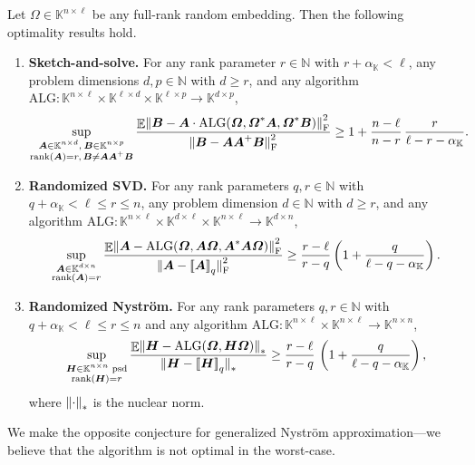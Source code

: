 \documentclass[11pt]{article}
\newcommand{\field}{\mathbb{K}}
\DeclareMathOperator{\rank}{rank}
\newcommand{\mat}[1]{\boldsymbol{#1}}
\newcommand{\lowrank}[1]{%
  \mleft[\!\mleft[ #1 \mright]\!\mright]}
\newcommand{\norm}[1]{\mleft\| #1 \mright\|}
\DeclareMathOperator{\expect}{\mathbb{E}}
\theoremstyle{definition}
\numberwithin{equation}{section}
\begin{document}
\begin{conjecture}
    Let $\mat{\varOmega} \in \field^{n \times \ell}$ be any full-rank random embedding.
    Then the following optimality results hold.
    \begin{enumerate}[label=(\alph*)]
        \item \textbf{Sketch-and-solve.} For any rank parameter $r \in \mathbb{N}$ with $r + \alpha_\field < \ell$, any problem dimensions $d, p \in \mathbb{N}$ with $d \geq r$, and any algorithm $\mathrm{ALG} : \field^{n \times \ell} \times \field^{\ell \times d} \times \field^{\ell \times p} \to \field^{d \times p}$,
        \begin{equation*}
            \sup_{\substack{\mat{A}\in \field^{n\times d},\: \mat{B} \in \field^{n\times p} \\
            \rank(\mat{A}) = r,\,\mat{B}\neq\mat{A}\mat{A}^+\mat{B}}} \frac{\expect \norm{\mat{B} - \mat{A}\cdot\mathrm{ALG}(\mat{\varOmega},\mat{\varOmega}^*\mat{A},\mat{\varOmega}^* \mat{B})}_{\rm F}^2}{\norm{\smash{\mat{B} - \mat{A} \mat{A}^+ \mat{B}}}_{\rm F}^2} 
            \ge 1 + \frac{n-\ell}{n-r}\, \frac{r}{\ell - r - \alpha_\field}.
        \end{equation*}
        \item \textbf{Randomized SVD.} 
        For any rank parameters $q,r \in \mathbb{N}$ with $q + \alpha_{\field} < \ell \leq r \leq n$,
        any problem dimension $d \in \mathbb{N}$ with $d \geq r$, and any algorithm $\mathrm{ALG} : \field^{n \times \ell} \times \field^{d \times \ell} \times \field^{n \times \ell} \to \field^{d \times n}$,
        \begin{equation*}
            \sup_{\substack{\mat{A} \in \field^{d \times n} \\ \rank(\mat{A}) = r}} \frac{\expect \norm{\mat{A} - \mathrm{ALG}(\mat{\varOmega},\mat{A}\mat{\varOmega},\mat{A}^*\mat{A}\mat{\varOmega})}_{\rm F}^2}
            {\norm{\smash{\mat{A} - \lowrank{\mat{A}}_q}}_{\rm F}^2} 
            \ge \frac{r -\ell}{r - q} \left(1 + \frac{q}{\ell - q - \alpha_\field}\right).
        \end{equation*}
        \item \textbf{Randomized Nystr\"om.} 
        For any rank parameters $q, r \in \mathbb{N}$ with $q + \alpha_{\field} < \ell \leq r \leq n$ and any algorithm $\mathrm{ALG} : \field^{n \times \ell}\times \field^{n \times \ell} \to \field^{n\times n}$,
        \begin{equation*}
            \sup_{\substack{\mat{H} \in \field^{n\times n} \text{ psd} \\ \rank(\mat{H}) = r}} \frac{\expect \norm{\mat{H} - \mathrm{ALG}(\mat{\varOmega},\mat{H}\mat{\varOmega})}_*}{\norm{\smash{\mat{H} - \lowrank{\mat{H}}_q}}_*} 
            \ge \frac{r-\ell}{r-q}\, \left(1 + \frac{q}{\ell - q - \alpha_\field}\right),
        \end{equation*}
        where $\norm{\cdot}_*$ is the nuclear norm.
    \end{enumerate}
\end{conjecture}
%
We make the opposite conjecture for generalized Nystr\"om approximation---we believe that the algorithm is not optimal in the worst-case.
\end{document}
